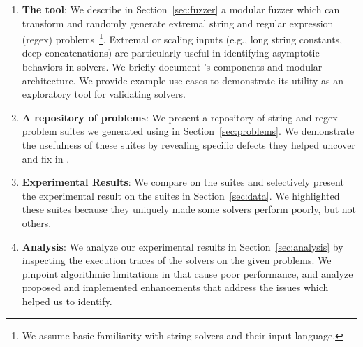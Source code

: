 \begin{enumerate}
\item \textbf{The \fuzzer{} tool}: We describe in
  Section~\ref{sec:fuzzer} a modular fuzzer which can transform and
  randomly generate extremal \smtfull{} string and regular expression
  (regex) problems~\footnote{We assume basic
    familiarity with string solvers and their input
    language.}. Extremal or scaling inputs (e.g., long string
  constants, deep concatenations) are particularly useful in
  identifying asymptotic behaviors in solvers. We briefly document \fuzzer{}'s
  components and modular architecture. We provide example use cases to
  demonstrate its utility as an exploratory tool for validating
  solvers.

\item \textbf{A repository of \smtfull{} problems}: We present a
  repository of \smtfull{} string and regex problem suites we
  generated using \fuzzer{} in Section~\ref{sec:problems}. We
  demonstrate the usefulness of these suites by revealing specific
  defects they helped uncover and fix in \us{}.

\item \textbf{Experimental Results}: We compare \theSolvers{} on the
  \fuzzer{} suites and selectively present the experimental result on
  the suites \theSuites{} in Section~\ref{sec:data}. We highlighted
  these suites because they uniquely made some solvers perform poorly,
  but not others.

\item \textbf{Analysis}: We analyze our experimental results in
  Section~\ref{sec:analysis} by inspecting the execution traces of the
  solvers on the given problems. We pinpoint algorithmic limitations
  in \us{} that cause poor performance, and analyze proposed and
  implemented enhancements that address the issues which \fuzzer{}
  helped us to identify.
\end{enumerate}

